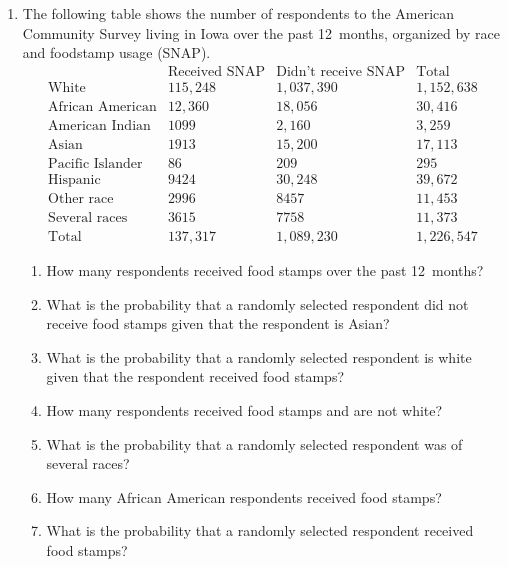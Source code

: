 \documentclass[12pt]{article}
\begin{document}
\begin{enumerate}
\item The following table shows the number
of respondents to the American Community
Survey living in Iowa over the past 12~months, 
organized by race and foodstamp usage (SNAP).
\[\begin{array}{l|rr|r}
&\text{Received SNAP}&\text{Didn't receive SNAP}
&\text{Total}\\\hline
\text{White}&115,248&1,037,390&1,152,638\\
\text{African American}&12,360&18,056&30,416\\
\text{American Indian}&1099&2,160&3,259\\
\text{Asian}&1913&15,200&17,113\\
\text{Pacific Islander}&86&209&295\\
\text{Hispanic}&9424&30,248&39,672\\
\text{Other race}&2996&8457&11,453\\
\text{Several races}&3615&7758&11,373\\\hline
\text{Total}&137,317&1,089,230&1,226,547
\end{array}\]
\begin{enumerate}
\item How many respondents received food stamps over the
past 12~months?
\item What is the probability that a randomly selected
respondent did not receive food stamps given that
the respondent is Asian?
\item What is the probability that a randomly selected
respondent is white given that the respondent
received food stamps?
\item How many respondents received food stamps and
are not white?
\item What is the probability that a randomly selected
respondent was of several races?
\item How many African American respondents received
food stamps?
\item What is the probability that a randomly selected
respondent received food stamps?
\end{enumerate}


\end{enumerate}
\end{document}
